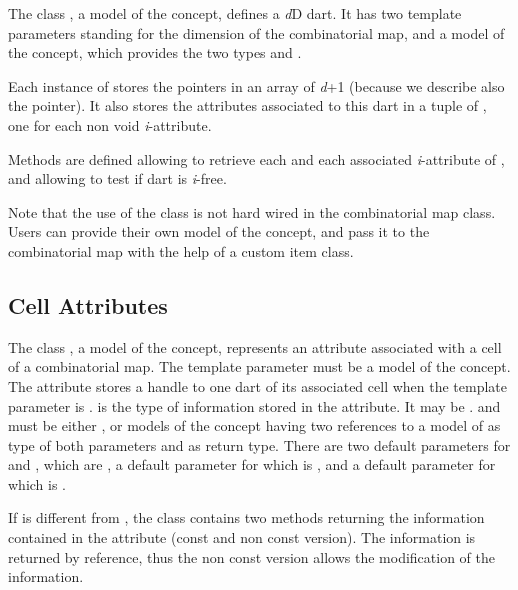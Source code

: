 The class , a model of the  concept,
defines a \emph{d}D dart. It has two template parameters standing for the
dimension of the combinatorial map, and a model of the
 concept, which provides the two types
 and . 

Each instance  of  stores the \betai{} pointers in an
array of \emph{d}+1  (because we describe also the
\betazero{} pointer).  It also stores the attributes associated to this
dart in a tuple of , one for each
non void \emph{i}-attribute.

Methods are defined allowing to retrieve each \betai{} and each
associated \emph{i}-attribute of , and allowing to test if 
dart is \emph{i}-free.

Note that the use of the  class is not hard wired in
the combinatorial map class. Users can provide their own model of the
 concept, and pass it to the combinatorial map with the help
of a custom item class.

\subsection{Cell Attributes}\label{ssec-attributes}

The class , a
model of the  concept, represents an attribute
associated with a cell of a combinatorial map.  The 
template parameter  must be a model of the
 concept.  The attribute stores a handle to one
dart of its associated cell when the template parameter  is
.
 is the type of information stored in the attribute. It may
be .   and  must be either
, or models of the  concept
having two references to a model of  as type of
both parameters and  as return type.  There are two default
parameters for  and , which are
, a default parameter for  which is
, and a default parameter for  which is
.

If  is different from , the class
 contains two methods  returning the
information contained in the attribute (const and non const version).
The information is returned by reference, thus the non const version
allows the modification of the information.

